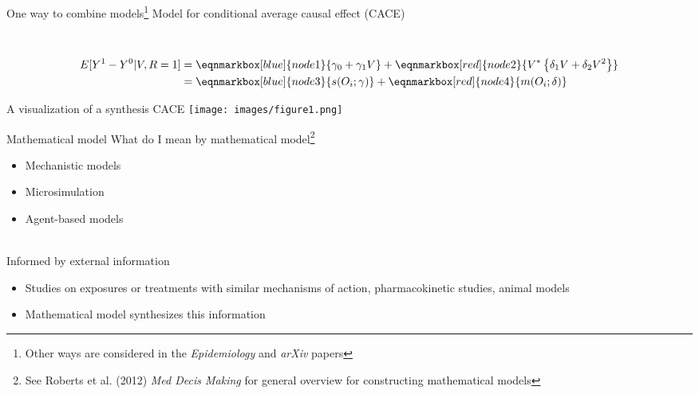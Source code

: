\documentclass{beamer}
\begin{document}
\begin{frame}{One way to combine models\footnote[frame]{Other ways are considered in the \textit{Epidemiology} and \textit{arXiv} papers}}
	Model for conditional average causal effect (CACE) \\~\\~\\
	\begin{equation*}
		\begin{aligned}
			E[Y^1-Y^0 |V,R=1] & = 
			\eqnmarkbox[blue]{node1}{\gamma_0 + \gamma_1 V}
			+ 
			\eqnmarkbox[red]{node2}{V^* \left\{\delta_1 V + \delta_2 V^2 \right\}} \\
			& = 
			\eqnmarkbox[blue]{node3}{s(O_i; \gamma)}
			+ 
			\eqnmarkbox[red]{node4}{m(O_i; \delta)}
		\end{aligned}
	\end{equation*}
\end{frame}

\begin{frame}{A visualization of a synthesis CACE}
	\centering
	\texttt{[image: images/figure1.png]}
\end{frame}

\begin{frame}{Mathematical model}
	What do I mean by mathematical model\footnote[frame]{See Roberts et al. (2012) \textit{Med Decis Making} for general overview for constructing mathematical models}
	\begin{itemize}
		\item Mechanistic models
		\item Microsimulation
		\item Agent-based models
	\end{itemize}
	~\\
	Informed by external information
	\begin{itemize}
		\item Studies on exposures or treatments with similar mechanisms of action, pharmacokinetic studies, animal models
		\item Mathematical model synthesizes this information
	\end{itemize}
\end{frame}
\end{document}
